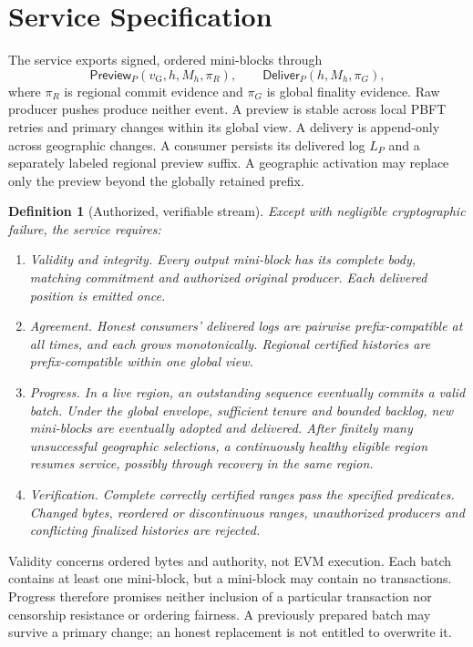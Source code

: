 \documentclass[11pt,a4paper,onecolumn]{article}
\newcommand{\gv}{v_{\mathrm G}}
\newcommand{\Tag}[1]{\mathsf{#1}}
\newtheorem{definition}{Definition}[section]
\theoremstyle{remark}\newtheorem{example}[definition]{Example}
\begin{document}
\section{Service Specification}\label{sec:spec}
The service exports signed, ordered mini-blocks through
\[
 \Tag{Preview}_P(\gv,h,M_h,\pi_R),\qquad
 \Tag{Deliver}_P(h,M_h,\pi_G),
\]
where $\pi_R$ is regional commit evidence and $\pi_G$ is global finality evidence.
Raw producer pushes produce neither event. A preview is stable across local
PBFT retries and primary changes within its global view. A delivery is
append-only across geographic changes. A consumer persists its delivered log
$L_P$ and a separately labeled regional preview suffix. A geographic activation
may replace only the preview beyond the globally retained prefix.

\begin{definition}[Authorized, verifiable stream]\label{def:service}
Except with negligible cryptographic failure, the service requires:
\begin{enumerate}[label=\textnormal{(\roman*)}]
\item \emph{Validity and integrity.} Every output mini-block has its complete
body, matching commitment and authorized original producer. Each delivered
position is emitted once.
\item \emph{Agreement.} Honest consumers' delivered logs are pairwise
prefix-compatible at all times, and each grows monotonically. Regional
certified histories are prefix-compatible within one global view.
\item \emph{Progress.} In a live region, an outstanding sequence eventually
commits a valid batch. Under the global envelope, sufficient tenure and bounded
backlog, new mini-blocks are eventually adopted and delivered. After finitely
many unsuccessful geographic selections, a continuously healthy eligible
region resumes service, possibly through recovery in the same region.
\item \emph{Verification.} Complete correctly certified ranges pass the
specified predicates. Changed bytes, reordered or discontinuous ranges,
unauthorized producers and conflicting finalized histories are rejected.
\end{enumerate}
\end{definition}
Validity concerns ordered bytes and authority, not EVM execution. Each batch
contains at least one mini-block, but a mini-block may contain no transactions.
Progress therefore promises neither inclusion of a particular transaction nor
censorship resistance or ordering fairness. A previously prepared batch may
survive a primary change; an honest replacement is not entitled to overwrite it.
\end{document}
